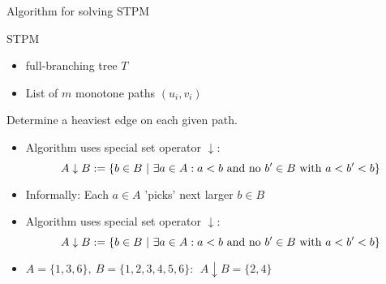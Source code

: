 \documentclass[18pt]{beamer}
\begin{document}
\begin{frame}{Algorithm for solving STPM}

	\begin{block}{STPM}
	 \begin{itemize}
	 	\item full-branching tree $T$
	 	\item List of $m$ monotone paths $(u_i,v_i)$
	 \end{itemize}
 	Determine a heaviest edge on each given path.
	\end{block}
	\bigskip
	\pause
	\begin{overprint}
	\begin{itemize}
	\item  Algorithm uses special {\color{blue}set operator} $\downarrow$:
	\[
		A \downarrow B := \{ b \in B \ | \ \exists a \in A: a < b \textup{ and no } b'\in B \textup{ with } a < b' < b \} 
	\]
	\item Informally: Each $a \in A$ 'picks' next larger $b \in B$ 
	\end{itemize}
	\begin{itemize}
		\item  Algorithm uses special {\color{blue}set operator} $\downarrow$:
		\[
		A \downarrow B := \{ b \in B \ | \ \exists a \in A: a < b \textup{ and no } b'\in B \textup{ with } a < b' < b \} 
		\]
		\item $A = \{1,3,6\}, \ B = \{1,2,3,4,5,6\}: \ \ A \downarrow B = \{2,4\}$ 
	\end{itemize}
	\end{overprint}
\end{frame}
\end{document}
